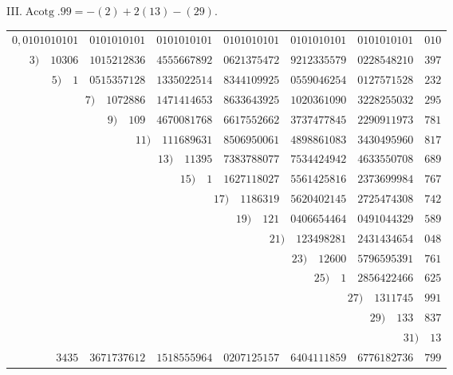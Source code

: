 \par{}
%
\begin{center}III.\quad $\operatorname{Acotg}.99=-(2)+2(13)-(29).$\end{center}
\begingroup\fontsize{8.5}{11}\selectfont\setlength{\tabcolsep}{2pt}
\begin{longtable}{@{}rrrrrrr@{}}
\hline
$0{,}0101010101$ & $0101010101$ & $0101010101$ & $0101010101$ & $0101010101$ & $0101010101$ & $010$\\
$3)\quad 10306$ & $1015212836$ & $4555667892$ & $0621375472$ & $9212335579$ & $0228548210$ & $397$\\
$5)\quad 1$ & $0515357128$ & $1335022514$ & $8344109925$ & $0559046254$ & $0127571528$ & $232$\\
\multicolumn{2}{r}{$7)\quad 1072886$} & $1471414653$ & $8633643925$ & $1020361090$ & $3228255032$ & $295$\\
\multicolumn{2}{r}{$9)\quad 109$} & $4670081768$ & $6617552662$ & $3737477845$ & $2290911973$ & $781$\\
 & \multicolumn{2}{r}{$11)\quad 111689631$} & $8506950061$ & $4898861083$ & $3430495960$ & $817$\\
 & \multicolumn{2}{r}{$13)\quad 11395$} & $7383788077$ & $7534424942$ & $4633550708$ & $689$\\
 & \multicolumn{2}{r}{$15)\quad 1$} & $1627118027$ & $5561425816$ & $2373699984$ & $767$\\
 &  & \multicolumn{2}{r}{$17)\quad 1186319$} & $5620402145$ & $2725474308$ & $742$\\
 &  & \multicolumn{2}{r}{$19)\quad 121$} & $0406654464$ & $0491044329$ & $589$\\
 &  &  & \multicolumn{2}{r}{$21)\quad 123498281$} & $2431434654$ & $048$\\
 &  &  & \multicolumn{2}{r}{$23)\quad 12600$} & $5796595391$ & $761$\\
 &  &  & \multicolumn{2}{r}{$25)\quad 1$} & $2856422466$ & $625$\\
 &  &  &  & \multicolumn{2}{r}{$27)\quad 1311745$} & $991$\\
 &  &  &  & \multicolumn{2}{r}{$29)\quad 133$} & $837$\\
 &  &  &  &  & \multicolumn{2}{r}{$31)\quad 13$}\\
\hline
$3435$ & $3671737612$ & $1518555964$ & $0207125157$ & $6404111859$ & $6776182736$ & $799$\\

\end{longtable}
